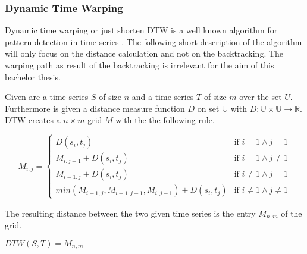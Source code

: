 \subsubsection{Dynamic Time Warping}
Dynamic time warping or just shorten DTW is a well known algorithm for pattern detection in time series
\cite{berndt1994using}. The following short description of the algorithm will only focus on the distance calculation and
not on the backtracking. The warping path as result of the backtracking is irrelevant for the aim of this bachelor
thesis.

Given are a time series $S$ of size $n$ and a time series $T$ of size $m$ over the set $U$. Furthermore is given a
distance measure function $D$ on set $\mathbb{U}$ with $D: \mathbb{U} \times \mathbb{U} \to \mathbb{R}$. DTW creates a
$n \times m$ grid $M$ with the the following rule.
\begin{center} \[ M_{i, j} = \begin{cases}
    D(s_i,t_j) & \text{if } i = 1 \wedge j = 1\\
    M_{i,j-1} + D(s_i,t_j) & \text{if } i = 1 \wedge j \neq 1\\
    M_{i-1,j} + D(s_i,t_j) & \text{if } i \neq 1 \wedge j = 1\\
    min(M_{i-1,j}, M_{i-1,j-1}, M_{i,j-1}) + D(s_i,t_j) & \text{if } i \neq 1 \wedge j \neq 1
\end{cases} \] \end{center}
The resulting distance between the two given time series is the entry $M_{n,m}$ of the grid.
\begin{center}
    $DTW(S, T) = M_{n,m}$
\end{center}
